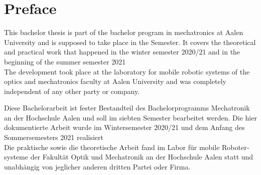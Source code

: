 \chapter*{Preface}
\label{preface}

This bachelor thesis is part of the bachelor program in mechatronics at Aalen University and is supposed to take place in the  Semester. It covers the theoretical and practical work that happened in the winter semester 2020/21 and in the beginning of the summer semester 2021\\

The development took place at the laboratory for mobile robotic systems of the optics and mechatronics faculty at Aalen University and was completely independent of any other party or company.

\vspace*{25mm}

\begin{otherlanguage}{ngerman}
Diese Bachelorarbeit ist fester Bestandteil des Bachelorprogramms Mechatronik an der Hochschule Aalen und soll im siebten Semester bearbeitet werden. Die hier dokumentierte Arbeit wurde im Wintersemester 2020/21 und dem Anfang des Sommersemesters 2021 realisiert\\

Die praktische sowie die theoretische Arbeit fand im Labor für mobile Robotersysteme der Fakultät Optik und Mechatronik an der Hochschule Aalen statt und unabhängig von jeglicher anderen dritten Partei oder Firma.
\end{otherlanguage}